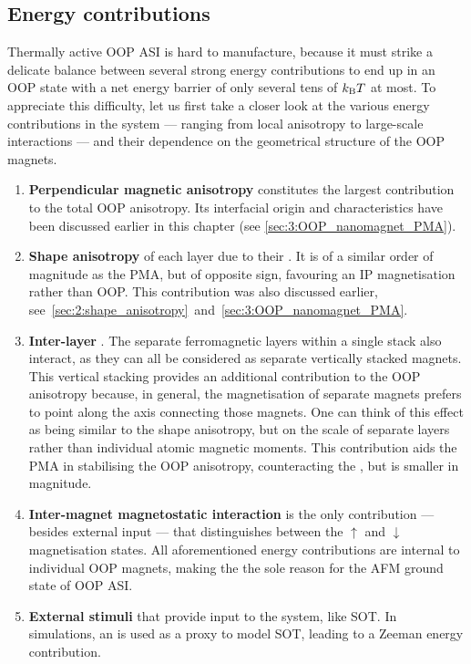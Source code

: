 \subsection{Energy contributions} \label{sec:3:E_contributions}
Thermally active OOP ASI is hard to manufacture, because it must strike a delicate balance between several strong energy contributions to end up in an OOP state with a net energy barrier of only several tens of $\kBT$ at most.
To appreciate this difficulty, let us first take a closer look at the various energy contributions in the system --- ranging from local anisotropy to large-scale interactions --- and their dependence on the geometrical structure of the OOP magnets.
\begin{enumerate}
	\item \textbf{Perpendicular magnetic anisotropy} constitutes the largest contribution to the total OOP anisotropy.
	Its interfacial origin and characteristics have been discussed earlier in this chapter (see \cref{sec:3:OOP_nanomagnet_PMA}). %
	\item \textbf{Shape anisotropy} of each layer due to their .
	It is of a similar order of magnitude as the PMA, but of opposite sign, favouring an IP magnetisation rather than OOP.
	This contribution was also discussed earlier, see~\cref{sec:2:shape_anisotropy}~and~\ref{sec:3:OOP_nanomagnet_PMA}. %
	\item \textbf{Inter-layer }.
	The separate ferromagnetic layers within a single stack also interact, as they can all be considered as separate vertically stacked magnets.
	This vertical stacking provides an additional contribution to the OOP anisotropy because, in general, the magnetisation of separate magnets prefers to point along the axis connecting those magnets.
	One can think of this effect as being similar to the shape anisotropy, but on the scale of separate layers rather than individual atomic magnetic moments.
	This contribution aids the PMA in stabilising the OOP anisotropy, counteracting the , but is smaller in magnitude. %
	\item \textbf{Inter-magnet magnetostatic interaction} is the only contribution --- besides external input --- that distinguishes between the $\uparrow$ and $\downarrow$ magnetisation states.
	All aforementioned energy contributions are internal to individual OOP magnets, making the  the sole reason for the AFM ground state of OOP ASI. %
	\item \textbf{External stimuli} that provide input to the system, like SOT.
	In simulations, an  is used as a proxy to model SOT, leading to a Zeeman energy contribution.
\end{enumerate}
